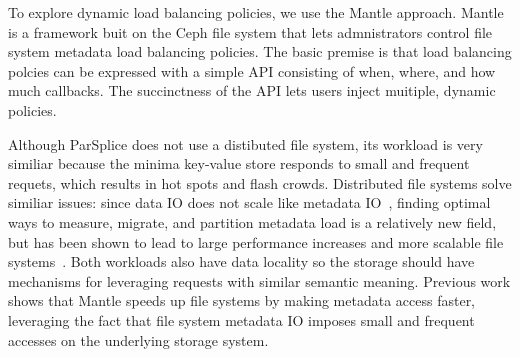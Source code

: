 To explore dynamic load balancing policies, we use the Mantle approach.  Mantle
is a framework buit on the Ceph file system that lets admnistrators control
file system metadata load balancing policies. The basic premise is that load
balancing polcies can be expressed with a simple API consisting of when, where,
and how much callbacks. The succinctness of the API lets users inject
muitiple, dynamic policies.  

Although ParSplice does not use a distibuted file system, its workload is very
similiar because the minima key-value store responds to small and frequent
requets, which results in hot spots and flash crowds.  Distributed file systems
solve similiar issues: since data IO does not scale like metadata
IO~\cite{roselli:atec2000-FS-workloads}, finding optimal ways to measure,
migrate, and partition metadata load is a relatively new field, but has been
shown to lead to large performance increases and more scalable file
systems~\cite{zheng:pdsw2014-batchfs, grider:pdsw2015-marfs,
ren:sc2014-indexfs, patil:fast2011-giga+, brandt:msst2003-lh}.  Both workloads
also have data locality so the storage should have mechanisms for leveraging
requests with similar semantic meaning.  Previous work shows that Mantle speeds
up file systems by making metadata access faster, leveraging the fact that file
system metadata IO imposes small and frequent accesses on the underlying
storage system.  


